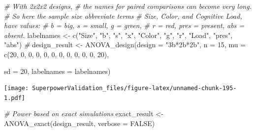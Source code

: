 \documentclass[
]{book}
\newenvironment{Shaded}{\begin{snugshade}}{\end{snugshade}}
\newcommand{\AttributeTok}[1]{\textcolor[rgb]{0.77,0.63,0.00}{#1}}
\newcommand{\CommentTok}[1]{\textcolor[rgb]{0.56,0.35,0.01}{\textit{#1}}}
\newcommand{\ConstantTok}[1]{\textcolor[rgb]{0.00,0.00,0.00}{#1}}
\newcommand{\DecValTok}[1]{\textcolor[rgb]{0.00,0.00,0.81}{#1}}
\newcommand{\FunctionTok}[1]{\textcolor[rgb]{0.00,0.00,0.00}{#1}}
\newcommand{\NormalTok}[1]{#1}
\newcommand{\OtherTok}[1]{\textcolor[rgb]{0.56,0.35,0.01}{#1}}
\newcommand{\StringTok}[1]{\textcolor[rgb]{0.31,0.60,0.02}{#1}}
\begin{document}
\begin{Shaded}
\begin{Highlighting}[]
\CommentTok{\# With 2x2x2 designs, }
\CommentTok{\# the names for paired comparisons can become very long. }
\CommentTok{\# So here the sample size abbreviate terms}
\CommentTok{\# Size, Color, and Cognitive Load, have values:}
\CommentTok{\# b = big, s = small, g = green, }
\CommentTok{\# r = red, pres = present, abs = absent.  }
\NormalTok{labelnames }\OtherTok{\textless{}{-}} \FunctionTok{c}\NormalTok{(}\StringTok{"Size"}\NormalTok{, }\StringTok{"b"}\NormalTok{, }\StringTok{"s"}\NormalTok{, }\StringTok{"x"}\NormalTok{, }\StringTok{"Color"}\NormalTok{, }\StringTok{"g"}\NormalTok{, }\StringTok{"r"}\NormalTok{, }
                \StringTok{"Load"}\NormalTok{, }\StringTok{"pres"}\NormalTok{, }\StringTok{"abs"}\NormalTok{) }\CommentTok{\#}
\NormalTok{design\_result }\OtherTok{\textless{}{-}} \FunctionTok{ANOVA\_design}\NormalTok{(}\AttributeTok{design =} \StringTok{"3b*2b*2b"}\NormalTok{, }
                              \AttributeTok{n =} \DecValTok{15}\NormalTok{, }
                              \AttributeTok{mu =} \FunctionTok{c}\NormalTok{(}\DecValTok{20}\NormalTok{, }\DecValTok{0}\NormalTok{, }\DecValTok{0}\NormalTok{, }\DecValTok{0}\NormalTok{, }\DecValTok{0}\NormalTok{, }
                                     \DecValTok{0}\NormalTok{, }\DecValTok{0}\NormalTok{, }\DecValTok{0}\NormalTok{, }\DecValTok{0}\NormalTok{, }\DecValTok{0}\NormalTok{, }\DecValTok{0}\NormalTok{, }\DecValTok{20}\NormalTok{), }
                              
                              \AttributeTok{sd =} \DecValTok{20}\NormalTok{, }
                              \AttributeTok{labelnames =}\NormalTok{ labelnames) }
\end{Highlighting}
\end{Shaded}

\texttt{[image: SuperpowerValidation\_files/figure-latex/unnamed-chunk-195-1.pdf]}

\begin{Shaded}
\begin{Highlighting}[]
\CommentTok{\# Power based on exact simulations}
\NormalTok{exact\_result }\OtherTok{\textless{}{-}} \FunctionTok{ANOVA\_exact}\NormalTok{(design\_result,}
                            \AttributeTok{verbose =} \ConstantTok{FALSE}\NormalTok{)}
\end{Highlighting}
\end{Shaded}
\end{document}
